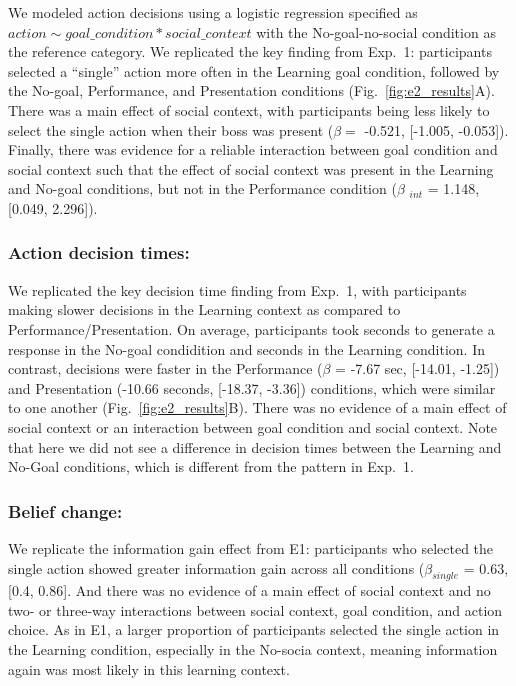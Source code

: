 \documentclass[10pt, letterpaper]{article}
\begin{document}
We modeled action decisions using a logistic regression specified as
\texttt{$action \sim goal\_condition * social\_context$} with the
No-goal-no-social condition as the reference category. We replicated the
key finding from Exp.~1: participants selected a ``single'' action more
often in the Learning goal condition, followed by the No-goal,
Performance, and Presentation conditions (Fig.~\ref{fig:e2_results}A).
There was a main effect of social context, with participants being less
likely to select the single action when their boss was present
(\(\beta =\) -0.521, {[}-1.005, -0.053{]}). Finally, there was evidence
for a reliable interaction between goal condition and social context
such that the effect of social context was present in the Learning and
No-goal conditions, but not in the Performance condition (\(\beta\)
\(_{int}\) = 1.148, {[}0.049, 2.296{]}).

\subsubsection{Action decision times:}\label{action-decision-times-1}

We replicated the key decision time finding from Exp.~1, with
participants making slower decisions in the Learning context as compared
to Performance/Presentation. On average, participants took seconds to
generate a response in the No-goal condidition and seconds in the
Learning condition. In contrast, decisions were faster in the
Performance (\(\beta\) = -7.67 sec, {[}-14.01, -1.25{]}) and
Presentation (-10.66 seconds, {[}-18.37, -3.36{]}) conditions, which
were similar to one another (Fig.~\ref{fig:e2_results}B). There was no
evidence of a main effect of social context or an interaction between
goal condition and social context. Note that here we did not see a
difference in decision times between the Learning and No-Goal
conditions, which is different from the pattern in Exp.~1.

\subsubsection{Belief change:}\label{belief-change-1}

We replicate the information gain effect from E1: participants who
selected the single action showed greater information gain across all
conditions (\(\beta_{single}\) = 0.63, {[}0.4, 0.86{]}. And there was no
evidence of a main effect of social context and no two- or three-way
interactions between social context, goal condition, and action choice.
As in E1, a larger proportion of participants selected the single action
in the Learning condition, especially in the No-socia context, meaning
information again was most likely in this learning context.
\end{document}
